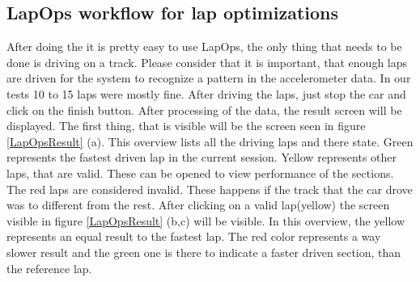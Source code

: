 \subsection{LapOps workflow for lap optimizations}
After doing the  it is pretty easy to use LapOps, the only thing that needs to be done is driving on a track. Please consider that it is important, that enough laps are driven for the system to recognize a pattern in the accelerometer data. In our tests 10 to 15 laps were mostly fine. After driving the laps, just stop the car and click on the finish button. After processing of the data, the result screen will be displayed. The first thing, that is visible will be the screen seen in figure \ref{LapOpsResult} (a). This overview lists all the driving laps and there state. Green represents the fastest driven lap in the current session. Yellow represents other laps, that are valid. These can be opened to view performance of the sections. The red laps are considered invalid. These happens if the track that the car drove was to different from the rest. After clicking on a valid lap(yellow) the screen visible in figure \ref{LapOpsResult} (b,c) will be visible. In this overview, the yellow represents an equal result to the fastest lap. The red color represents a way slower result and the green one is there to indicate a faster driven section, than the reference lap.
